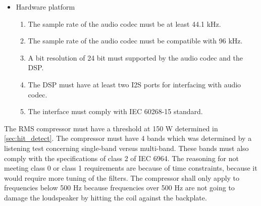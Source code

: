 \begin{itemize}
\item Hardware platform
\begin{enumerate}
\item [\textlabel{4}{samplerate44}] The sample rate of the audio codec must be at least 44.1 kHz.\\
\item [\textlabel{5}{samplerate96}] The sample rate of the audio codec must be compatible with 96 kHz.\\
\item [\textlabel{6}{resolution}]  A bit resolution of 24 bit must supported by the audio codec and the DSP.\\
\item [\textlabel{7}{I2S}] The DSP must have at least two I2S ports for interfacing with audio codec.\\
\item [\textlabel{8}{IEC}] The interface must comply with IEC 60268-15 standard.
\end{enumerate}
\end{itemize}


The RMS compressor must have a threshold at 150 W determined in \autoref{sec:hit_detect}. The compressor must have 4 bands which was determined by a listening test concerning single-band versus multi-band. These bands must also comply with the specifications of class 2 of IEC 6964. The reasoning for not meeting class 0 or class 1 requirements are because of time constraints, because it would require more tuning of the filters. The compressor shall only apply to frequencies below 500 Hz because frequencies over 500 Hz are not going to damage the loudspeaker by hitting the coil against the backplate. 

